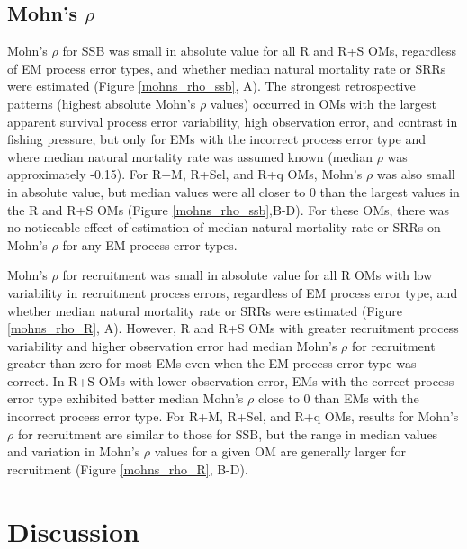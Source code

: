 \documentclass[
  12pt,
]{article}
\begin{document}
\hypertarget{mohns-rho-1}{%
\subsection*{\texorpdfstring{Mohn's
\(\rho\)}{Mohn's \textbackslash rho}}\label{mohns-rho-1}}

Mohn's \(\rho\) for SSB was small in absolute value for all R and R+S
OMs, regardless of EM process error types, and whether median natural
mortality rate or SRRs were estimated (Figure \ref{mohns_rho_ssb}, A).
The strongest retrospective patterns (highest absolute Mohn's \(\rho\)
values) occurred in OMs with the largest apparent survival process error
variability, high observation error, and contrast in fishing pressure,
but only for EMs with the incorrect process error type and where median
natural mortality rate was assumed known (median \(\rho\) was
approximately -0.15). For R+M, R+Sel, and R+q OMs, Mohn's \(\rho\) was
also small in absolute value, but median values were all closer to 0
than the largest values in the R and R+S OMs (Figure
\ref{mohns_rho_ssb},B-D). For these OMs, there was no noticeable effect
of estimation of median natural mortality rate or SRRs on Mohn's
\(\rho\) for any EM process error types.

Mohn's \(\rho\) for recruitment was small in absolute value for all R
OMs with low variability in recruitment process errors, regardless of EM
process error type, and whether median natural mortality rate or SRRs
were estimated (Figure \ref{mohns_rho_R}, A). However, R and R+S OMs
with greater recruitment process variability and higher observation
error had median Mohn's \(\rho\) for recruitment greater than zero for
most EMs even when the EM process error type was correct. In R+S OMs
with lower observation error, EMs with the correct process error type
exhibited better median Mohn's \(\rho\) close to 0 than EMs with the
incorrect process error type. For R+M, R+Sel, and R+q OMs, results for
Mohn's \(\rho\) for recruitment are similar to those for SSB, but the
range in median values and variation in Mohn's \(\rho\) values for a
given OM are generally larger for recruitment (Figure \ref{mohns_rho_R},
B-D).

\hypertarget{discussion}{%
\section*{Discussion}\label{discussion}}
\end{document}
